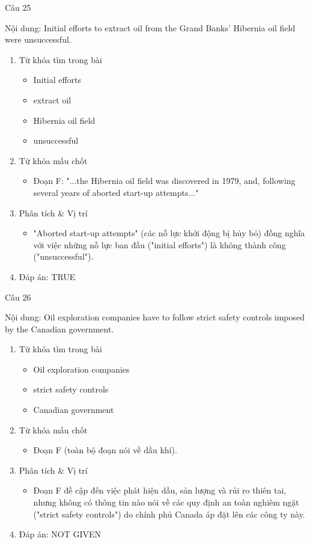 \documentclass{../templateReading/cdreading}
\begin{document}
Câu 25

Nội dung: Initial efforts to extract oil from the Grand Banks’ Hibernia oil field were unsuccessful.
\begin{enumerate}
\item Từ khóa tìm trong bài
\begin{itemize}
\item Initial efforts
\item extract oil
\item Hibernia oil field
\item unsuccessful
\end{itemize}
\item Từ khóa mấu chốt
\begin{itemize}
\item Đoạn F: "...the Hibernia oil field was discovered in 1979, and, following several years of aborted start-up attempts..."
\end{itemize}
\item Phân tích \& Vị trí
\begin{itemize}
\item "Aborted start-up attempts" (các nỗ lực khởi động bị hủy bỏ) đồng nghĩa với việc những nỗ lực ban đầu ("initial efforts") là không thành công ("unsuccessful").
\end{itemize}
\item Đáp án: TRUE
\end{enumerate}

Câu 26

Nội dung: Oil exploration companies have to follow strict safety controls imposed by the Canadian government.
\begin{enumerate}
\item Từ khóa tìm trong bài
\begin{itemize}
\item Oil exploration companies
\item strict safety controls
\item Canadian government
\end{itemize}
\item Từ khóa mấu chốt
\begin{itemize}
\item Đoạn F (toàn bộ đoạn nói về dầu khí).
\end{itemize}
\item Phân tích \& Vị trí
\begin{itemize}
\item Đoạn F đề cập đến việc phát hiện dầu, sản lượng và rủi ro thiên tai, nhưng không có thông tin nào nói về các quy định an toàn nghiêm ngặt ("strict safety controls") do chính phủ Canada áp đặt lên các công ty này.
\end{itemize}
\item Đáp án: NOT GIVEN
\end{enumerate}
\end{document}
